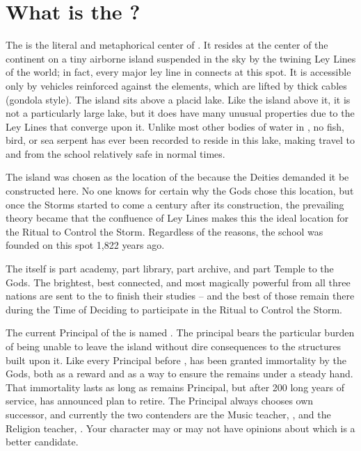 \documentclass[blue]{GL2020}
\begin{document}
\name{\bSchool{}}

\section*{What is the \pSchool{}?}
The \pSchool{} is the literal and metaphorical center of \pEarth{}. It resides at the center of the continent on a tiny airborne island suspended in the sky by the twining Ley Lines of the world; in fact, every major ley line in \pEarth{} connects at this spot. It is accessible only by vehicles reinforced against the elements, which are lifted by thick cables (gondola style). The island sits above a placid lake. Like the island above it, it is not a particularly large lake, but it does have many unusual properties due to the Ley Lines that converge upon it. Unlike most other bodies of water in \pEarth{}, no fish, bird, or sea serpent has ever been recorded to reside in this lake, making travel to and from the school relatively safe in normal times.

The island was chosen as the location of the \pSc{} because the Deities demanded it be constructed here. No one knows for certain why the Gods chose this location, but once the Storms started to come a century after its construction, the prevailing theory became that the confluence of Ley Lines makes this the ideal location for the Ritual to Control the Storm. Regardless of the reasons, the school was founded on this spot 1,822 years ago.

The \pSc{} itself is part academy, part library, part archive, and part Temple to the Gods. The brightest, best connected, and most magically powerful from all three nations are sent to the \pSchool{} to finish their studies -- and the best of those remain there during the Time of Deciding to participate in the Ritual to Control the Storm.

The current Principal of the \pSc{} is named \cPrincipal{\full}. The principal bears the particular burden of being unable to leave the island without dire consequences to the structures built upon it. Like every Principal before \cPrincipal{\them}, \cPrincipal{} has been granted immortality by the Gods, both as a reward and as a way to ensure the \pSc{} remains under a steady hand. That immortality lasts as long as \cPrincipal{} remains Principal, but after 200 long years of service, \cPrincipal{\they} has announced \cPrincipal{\their} plan to retire. The Principal always chooses \cPrincipal{\their} own successor, and currently the two contenders are the Music teacher, \cMusic{\full}, and the Religion teacher, \cBeetle{\full}. Your character may or may not have opinions about which is a better candidate.
\end{document}
